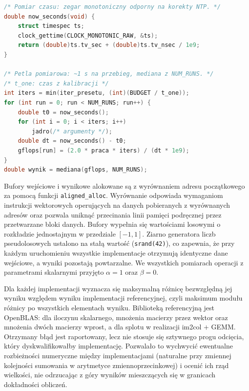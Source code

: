 \documentclass[a4paper,12pt]{book} %
\begin{document}
\begin{lstfloat}[t!]
\begin{lstlisting}[language=C, caption={Funkcja pomiaru czasu oraz uproszczony szkic adaptacyjnej pętli pomiarowej: każdy przebieg trwa około sekundy, a raportowana jest mediana wydajności z \texttt{NUM\_RUNS} przebiegów}, label={lst:pomiar}]
/* Pomiar czasu: zegar monotoniczny odporny na korekty NTP. */
double now_seconds(void) {
    struct timespec ts;
    clock_gettime(CLOCK_MONOTONIC_RAW, &ts);
    return (double)ts.tv_sec + (double)ts.tv_nsec / 1e9;
}

/* Petla pomiarowa: ~1 s na przebieg, mediana z NUM_RUNS. */
/* t_one: czas z kalibracji */
int iters = min(iter_presetu, (int)(BUDGET / t_one));
for (int run = 0; run < NUM_RUNS; run++) {
    double t0 = now_seconds();
    for (int i = 0; i < iters; i++)
        jadro(/* argumenty */);
    double dt = now_seconds() - t0;
    gflops[run] = (2.0 * praca * iters) / (dt * 1e9);
}
double wynik = mediana(gflops, NUM_RUNS);
\end{lstlisting}
\end{lstfloat}

Bufory wejściowe i wynikowe alokowane są z wyrównaniem adresu początkowego za pomocą funkcji \texttt{aligned\_alloc}. Wyrównanie odpowiada wymaganiom instrukcji wektorowych operujących na danych pobieranych z wyrównanych adresów oraz pozwala uniknąć przecinania linii pamięci podręcznej przez przetwarzane bloki danych. Bufory wypełnia się wartościami losowymi o rozkładzie jednostajnym w przedziale $[-1, 1]$. Ziarno generatora liczb pseudolosowych ustalono na stałą wartość (\texttt{srand(42)}), co zapewnia, że przy każdym uruchomieniu wszystkie implementacje otrzymują identyczne dane wejściowe, a wyniki pozostają powtarzalne. We wszystkich pomiarach operacji z parametrami skalarnymi przyjęto $\alpha = 1$ oraz $\beta = 0$.

Dla każdej implementacji wyznacza się maksymalną różnicę bezwzględną jej wyniku względem wyniku implementacji referencyjnej, czyli maksimum modułu różnicy po wszystkich elementach wyniku. Biblioteką referencyjną jest OpenBLAS: dla iloczynu skalarnego, mnożenia macierzy przez wektor oraz mnożenia dwóch macierzy wprost, a dla splotu w realizacji im2col $+$ GEMM. Otrzymany błąd jest raportowany, lecz nie stosuje się sztywnego progu odcięcia, który dyskwalifikowałby implementację. Pozwalało to wychwycić ewentualne rozbieżności numeryczne między implementacjami (naturalne przy zmiennej kolejności sumowania w arytmetyce zmiennoprzecinkowej) i ocenić ich rząd wielkości, nie odrzucając z góry wyników mieszczących się w granicach dokładności obliczeń.
\end{document}
